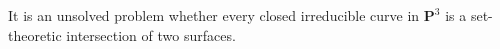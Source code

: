 It is an unsolved problem whether every closed irreducible curve in $\mathbf{P}^3$ is a set-theoretic intersection of two surfaces.
